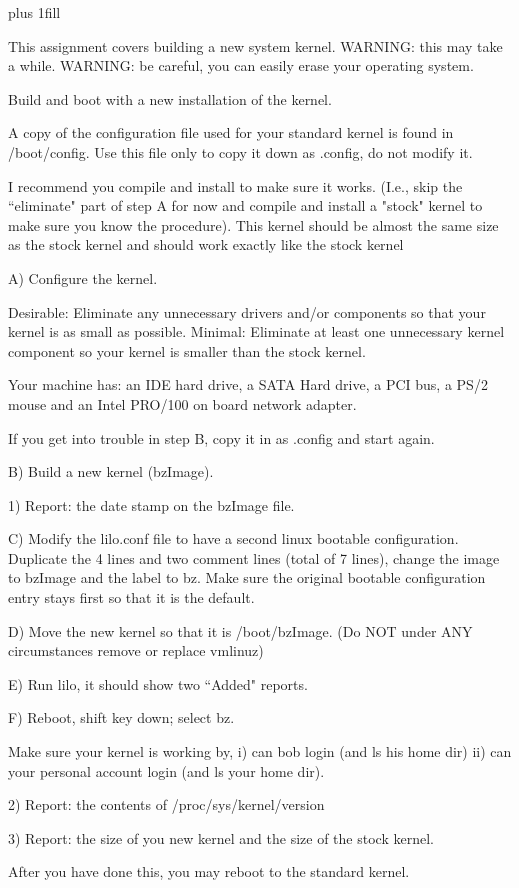 
\rightskip=0pt plus 1fill

\parindent 0pt

This assignment covers building a new system kernel.
WARNING: this may take a while.
WARNING: be careful, you can easily erase your operating system.

Build and boot with a new installation of the kernel.

A copy of the configuration file used for your standard kernel
is found in {\ltt{}/boot/config}. Use this file only
to copy it down as {\ltt{}.config}, do not modify it.

I recommend you compile and install to make sure it works.
(I.e., skip the ``eliminate" part of step A for now and compile and
install a "stock" kernel to
make sure you know the procedure).
This kernel should be almost the same size as the stock kernel and should
work exactly like the stock kernel

A) Configure the kernel. 

Desirable:
Eliminate any unnecessary drivers and/or components so that your kernel is
as small as possible.
Minimal: Eliminate at least one unnecessary kernel component so your kernel
is smaller than the stock kernel.


Your machine has:
an IDE hard drive, a SATA Hard drive, a PCI bus, a PS/2 mouse
and
an Intel PRO/100 on board network adapter.

If you get into trouble in step B, copy it in as {\ltt{}.config}
and start again.

B) Build a new kernel ({\ltt{}bzImage}).

1) Report: the date stamp on the bzImage file.

C) Modify the {\ltt{}lilo.conf} file to have a second linux
bootable configuration.
Duplicate the 4 lines and two comment lines (total of 7 lines),
change the image to {\ltt{}bzImage} and the label to {\ltt{}bz}.
Make sure the original bootable configuration entry stays first so that
it is the default.

D) Move the new kernel so that it is {\ltt{}/boot/bzImage}.
(Do NOT under ANY circumstances remove or replace {\ltt{}vmlinuz})

E) Run lilo, it should show two ``Added" reports.

F) Reboot, shift key down; select bz.

Make sure your kernel is working by,
i) can bob login (and ls his home dir)
ii) can your personal account login (and ls your home dir). 

2) Report: the contents of {\ltt{}/proc/sys/kernel/version} 

3) Report: the size of you new kernel and the size of the stock kernel.

After you have done this, you may reboot to the standard kernel.
\bye
